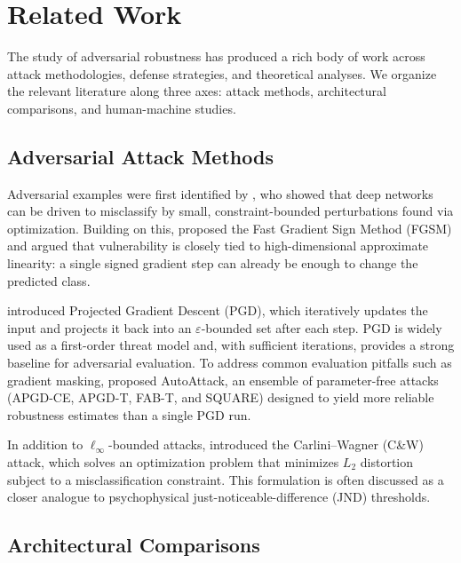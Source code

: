 \documentclass[12pt,a4paper]{article}
\begin{document}
\section{Related Work}
\label{sec:related}

The study of adversarial robustness has produced a rich body of work
across attack methodologies, defense strategies, and theoretical
analyses. We organize the relevant literature along three axes:
attack methods, architectural comparisons, and human-machine studies.

\subsection{Adversarial Attack Methods}

Adversarial examples were first identified by \citet{szegedy2013intriguing},
who showed that deep networks can be driven to misclassify by small,
constraint-bounded perturbations found via optimization. Building on this,
\citet{goodfellow2015explaining} proposed the Fast Gradient Sign Method
(FGSM) and argued that vulnerability is closely tied to high-dimensional
approximate linearity: a single signed gradient step can already be enough
to change the predicted class.

\citet{madry2018towards} introduced Projected Gradient Descent (PGD), which
iteratively updates the input and projects it back into an
$\varepsilon$-bounded set after each step. PGD is widely used as a
first-order threat model and, with sufficient iterations, provides a strong
baseline for adversarial evaluation. To address common evaluation pitfalls
such as gradient masking, \citet{croce2020reliable} proposed AutoAttack, an
ensemble of parameter-free attacks (APGD-CE, APGD-T, FAB-T, and SQUARE)
designed to yield more reliable robustness estimates than a single PGD run.

In addition to $\ell_\infty$-bounded attacks, \citet{carlini2017towards}
introduced the Carlini--Wagner (C\&W) attack, which solves an
optimization problem that minimizes $L_2$ distortion subject to a
misclassification constraint. This formulation is often discussed as a
closer analogue to psychophysical just-noticeable-difference (JND)
thresholds.

\subsection{Architectural Comparisons}
\end{document}
